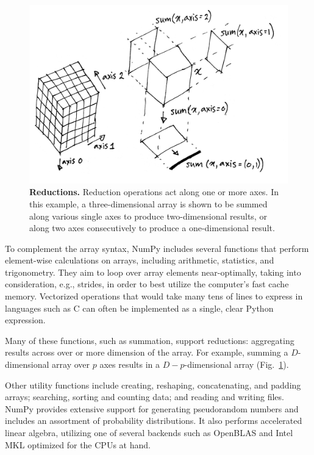 \begin{figure}
  \centering
  \includegraphics[width=\linewidth]{static/sketches/reductions}
  \caption{\textbf{Reductions.} Reduction operations act along one or more axes. In this example, a three-dimensional array is shown to be summed along various single axes to produce two-dimensional results, or along two axes consecutively to produce a one-dimensional result. 
   }
  \label{fig:reductions}
\end{figure}

To complement the array syntax, NumPy includes several functions that perform
element-wise calculations on arrays, including arithmetic, statistics, and
trigonometry.
They aim to loop over array elements near-optimally, taking into consideration,
e.g., strides, in order to best utilize the computer's fast cache memory.
Vectorized operations that would take many tens of lines to express in
languages such as C can often be implemented as a single, clear Python
expression.

Many of these functions, such as summation, support reductions: aggregating
results across over or more dimension of the array.
For example, summing a $D$-dimensional array over $p$ axes results in a
$D-p$-dimensional array (Fig.~\ref{fig:reductions}).

Other utility functions include creating, reshaping, concatenating, and padding
arrays; searching, sorting and counting data; and reading and writing files.
NumPy provides extensive support for generating pseudorandom numbers and
includes an assortment of probability distributions.
It also performs accelerated linear algebra, utilizing one of several backends
such as OpenBLAS and Intel MKL optimized for the CPUs at hand.

